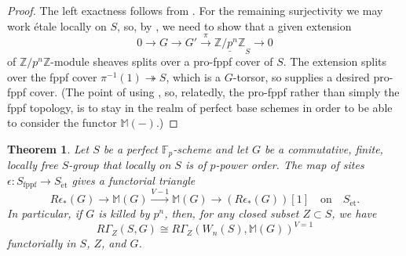 \documentclass[11pt, reqno]{amsart}
\newcommand{\bF}{\mathbb{F}}
\newcommand{\bM}{\mathbb{M}}
\newcommand{\bZ}{\mathbb{Z}}
\newcommand{\sS}{\mathscr{S}}
\DeclareMathOperator{\Spec}{Spec}		%
\newcommand{\eps}{\epsilon}
\newcommand{\et}{\mathrm{\acute{e}t}}	%
\newcommand{\fppf}{\mathrm{fppf}}		%
\renewcommand{\i}{^{-1}}
\newcommand{\ra}{\rightarrow}
\newcommand{\surjects}{\twoheadrightarrow}
\newcommand{\xra}{\xrightarrow}
\providecommand{\up}[1]{{\upshape(}#1{\upshape)}}
\providecommand{\uref}[1]{{\upshape\ref{#1}}}
\providecommand{\uS}{{\upshape\S}}
\providecommand{\uscolon}{{\upshape;} }
\providecommand{\qxq}[1]{\quad\text{#1}\quad}
\newcommand{\be}{\begin{equation}}
\newcommand{\ee}{\end{equation}}
\newcommand{\bpf}{\begin{proof}}
\newcommand{\epf}{\end{proof}}
\newcommand{\bthm}{\begin{thm}}
\newcommand{\ethm}{\end{thm}}
\numberwithin{equation}{numberingbase}
\theoremstyle{thms}
\newtheorem{thm}[numberingbase]{Theorem}
\theoremstyle{claims}
\theoremstyle{defs}
\theoremstyle{thms}
\theoremstyle{defs}
\theoremstyle{subsection-tweak}
\theoremstyle{subsection-tweak}
\begin{document}
\bpf
The left exactness follows from . For the remaining surjectivity we may work \'{e}tale locally on $S$, so, by , we need to show that a given extension 
\[
0 \ra G \ra G' \xra{\pi} \underline{\bZ/p^n\bZ}_S \ra 0
\]
of $\bZ/p^n\bZ$-module sheaves splits over a pro-fppf cover of $S$. The extension splits over the fppf cover $\pi\i(1) \surjects S$, which is a $G$-torsor, %
so  supplies a desired pro-fppf cover. (The point of using , so, relatedly, the pro-fppf rather than simply the fppf topology, is to stay in the realm of perfect base schemes in order to be able to consider the functor $\bM(-)$.)
\epf



\bthm \label{KT-input}
Let $S$ be a perfect $\bF_p$-scheme and let $G$ be a commutative, finite, locally free $S$-group that locally on $S$ is of $p$-power order. The map  of sites $\eps \colon S_\fppf \ra S_{\et}$ gives a functorial triangle
\be \label{eqn:KT-triangle}
R\eps_*(G) \ra \bM(G) \xra{V - 1} \bM(G) \ra (R\eps_*(G))[1] \qxq{on} S_\et.
\ee
In particular, if $G$ is killed by $p^n$, then, %
for any closed subset $Z \subset S$, we have
\be \label{crystalline-cor}
R\Gamma_Z(S, G) \cong R\Gamma_Z(W_n(S), \bM(G))^{V = 1}  %
\ee
functorially in $S$, $Z$, and $G$.
\ethm




\end{document}
